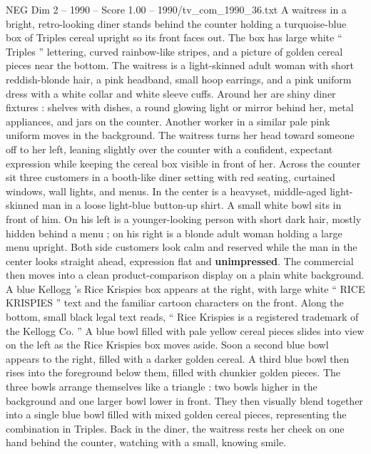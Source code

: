 \begin{textsample}{NEG Dim 2 – 1990 – Score 1.00 – 1990/tv\_com\_1990\_36.txt}  \label{ex:f2_neg_065}
A waitress in a bright, retro-looking diner stands behind the counter holding a turquoise-blue box of Triples cereal upright so its front faces out.
The box has large white “ Triples ” lettering, curved rainbow-like stripes, and a picture of golden cereal pieces near the bottom.
The waitress is a light-skinned adult woman with short reddish-blonde hair, a pink headband, small hoop earrings, and a pink uniform dress with a white collar and white sleeve cuffs.
Around her are shiny diner fixtures : shelves with dishes, a round glowing light or mirror behind her, metal appliances, and jars on the counter.
Another worker in a similar pale pink uniform moves in the background.
The waitress turns her head toward someone off to her left, leaning slightly over the counter with a confident, expectant expression while keeping the cereal box visible in front of her.
Across the counter sit three customers in a booth-like diner setting with red seating, curtained windows, wall lights, and menus.
In the center is a heavyset, middle-aged light-skinned man in a loose light-blue button-up shirt.
A small white bowl sits in front of him.
On his left is a younger-looking person with short dark hair, mostly hidden behind a menu ; on his right is a blonde adult woman holding a large menu upright.
Both side customers look calm and reserved while the man in the center looks straight ahead, expression flat and \textbf{unimpressed}.
The commercial then moves into a clean product-comparison display on a plain white background.
A blue Kellogg ’s Rice Krispies box appears at the right, with large white “ RICE KRISPIES ” text and the familiar cartoon characters on the front.
Along the bottom, small black legal text reads, “ Rice Krispies is a registered trademark of the Kellogg Co. ” A blue bowl filled with pale yellow cereal pieces slides into view on the left as the Rice Krispies box moves aside.
Soon a second blue bowl appears to the right, filled with a darker golden cereal.
A third blue bowl then rises into the foreground below them, filled with chunkier golden pieces.
The three bowls arrange themselves like a triangle : two bowls higher in the background and one larger bowl lower in front.
They then visually blend together into a single blue bowl filled with mixed golden cereal pieces, representing the combination in Triples.
Back in the diner, the waitress rests her cheek on one hand behind the counter, watching with a small, knowing smile.

\end{textsample}
